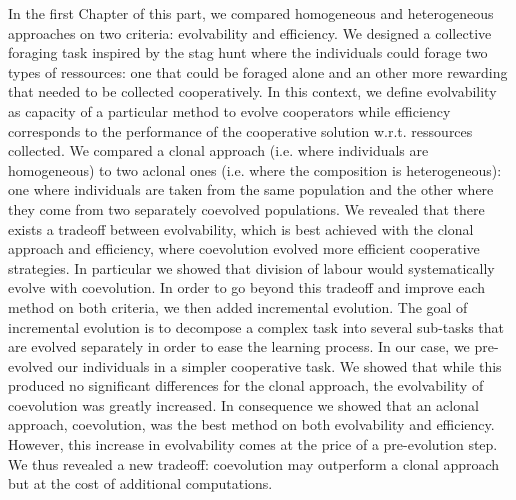 		In the first Chapter of this part, we compared homogeneous and heterogeneous approaches on two criteria: evolvability and efficiency. We designed a collective foraging task inspired by the stag hunt where the individuals could forage two types of ressources: one that could be foraged alone and an other more rewarding that needed to be collected cooperatively. In this context, we define evolvability as capacity of a particular method to evolve cooperators while efficiency corresponds to the performance of the cooperative solution w.r.t. ressources collected. We compared a clonal approach (i.e. where individuals are homogeneous) to two aclonal ones (i.e. where the composition is heterogeneous): one where individuals are taken from the same population and the other where they come from two separately coevolved populations. We revealed that there exists a tradeoff between evolvability, which is best achieved with the clonal approach and efficiency, where coevolution evolved more efficient cooperative strategies. In particular we showed that division of labour would systematically evolve with coevolution. In order to go beyond this tradeoff and improve each method on both criteria, we then added incremental evolution. The goal of incremental evolution is to decompose a complex task into several sub-tasks that are evolved separately in order to ease the learning process. In our case, we pre-evolved our individuals in a simpler cooperative task. We showed that while this produced no significant differences for the clonal approach, the evolvability of coevolution was greatly increased. In consequence we showed that an aclonal approach, coevolution, was the best method on both evolvability and efficiency. However, this increase in evolvability comes at the price of a pre-evolution step. We thus revealed a new tradeoff: coevolution may outperform a clonal approach but at the cost of additional computations.

